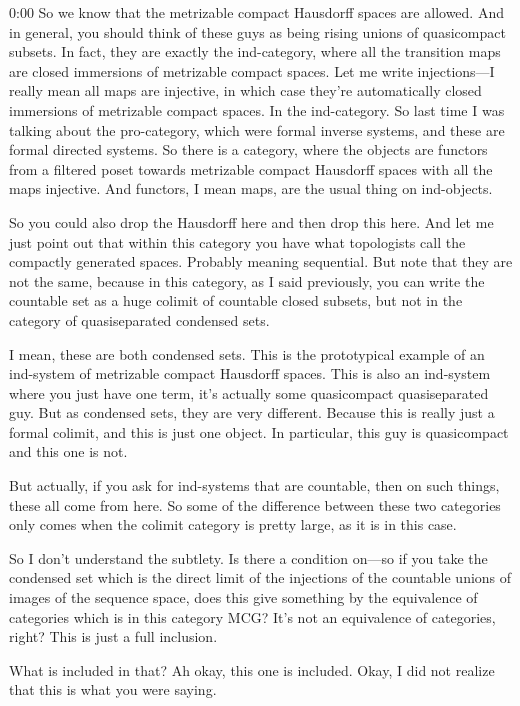\begin{unfinished}{0:00}
So we know that the metrizable compact Hausdorff spaces are allowed. And in general, you should think of these guys as being rising unions of quasicompact subsets. In fact, they are exactly the ind-category, where all the transition maps are closed immersions of metrizable compact spaces. Let me write injections---I really mean all maps are injective, in which case they're automatically closed immersions of metrizable compact spaces. In the ind-category. So last time I was talking about the pro-category, which were formal inverse systems, and these are formal directed systems. So there is a category, where the objects are functors from a filtered poset towards metrizable compact Hausdorff spaces with all the maps injective. And functors, I mean maps, are the usual thing on ind-objects.

So you could also drop the Hausdorff here and then drop this here. And let me just point out that within this category you have what topologists call the compactly generated spaces. Probably meaning sequential. But note that they are not the same, because in this category, as I said previously, you can write the countable set as a huge colimit of countable closed subsets, but not in the category of quasiseparated condensed sets.

I mean, these are both condensed sets. This is the prototypical example of an ind-system of metrizable compact Hausdorff spaces. This is also an ind-system where you just have one term, it's actually some quasicompact quasiseparated guy. But as condensed sets, they are very different. Because this is really just a formal colimit, and this is just one object. In particular, this guy is quasicompact and this one is not.

But actually, if you ask for ind-systems that are countable, then on such things, these all come from here. So some of the difference between these two categories only comes when the colimit category is pretty large, as it is in this case.

So I don't understand the subtlety. Is there a condition on---so if you take the condensed set which is the direct limit of the injections of the countable unions of images of the sequence space, does this give something by the equivalence of categories which is in this category MCG? It's not an equivalence of categories, right? This is just a full inclusion.

What is included in that? Ah okay, this one is included. Okay, I did not realize that this is what you were saying. 


\end{unfinished}
